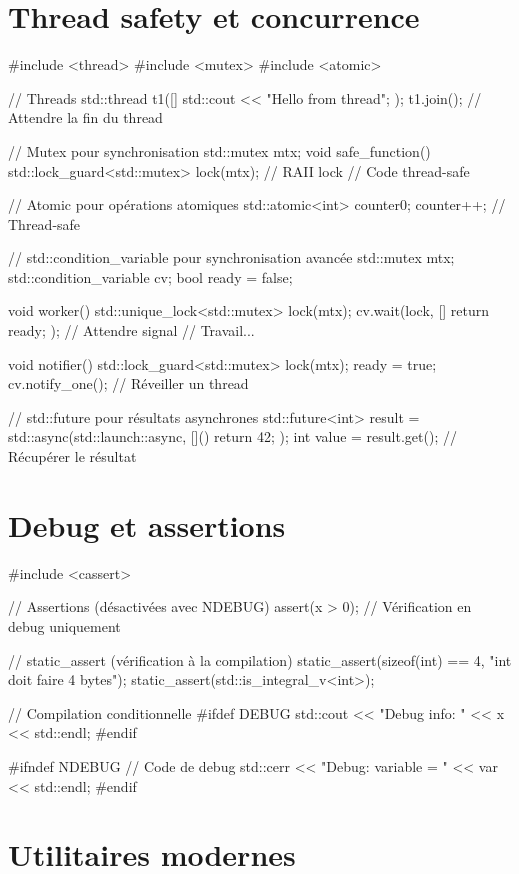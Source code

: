 \documentclass{article}
\begin{document}
\begin{multicols*}{4}
\section*{Thread safety et concurrence}
\begin{cppcode}
#include <thread>
#include <mutex>
#include <atomic>

// Threads
std::thread t1([]{ std::cout << "Hello from thread\n"; });
t1.join(); // Attendre la fin du thread

// Mutex pour synchronisation
std::mutex mtx;
void safe_function() {
    std::lock_guard<std::mutex> lock(mtx); // RAII lock
    // Code thread-safe
}

// Atomic pour opérations atomiques
std::atomic<int> counter{0};
counter++; // Thread-safe

// std::condition_variable pour synchronisation avancée
std::mutex mtx;
std::condition_variable cv;
bool ready = false;

void worker() {
    std::unique_lock<std::mutex> lock(mtx);
    cv.wait(lock, []{ return ready; }); // Attendre signal
    // Travail...
}

void notifier() {
    {
        std::lock_guard<std::mutex> lock(mtx);
        ready = true;
    }
    cv.notify_one(); // Réveiller un thread
}

// std::future pour résultats asynchrones
std::future<int> result = std::async(std::launch::async, [](){
    return 42;
});
int value = result.get(); // Récupérer le résultat
\end{cppcode}

\section*{Debug et assertions}
\begin{cppcode}
#include <cassert>

// Assertions (désactivées avec NDEBUG)
assert(x > 0); // Vérification en debug uniquement

// static_assert (vérification à la compilation)
static_assert(sizeof(int) == 4, "int doit faire 4 bytes");
static_assert(std::is_integral_v<int>);

// Compilation conditionnelle
#ifdef DEBUG
    std::cout << "Debug info: " << x << std::endl;
#endif

#ifndef NDEBUG
    // Code de debug
    std::cerr << "Debug: variable = " << var << std::endl;
#endif
\end{cppcode}

\section*{Utilitaires modernes}


\end{multicols*}
\end{document}
